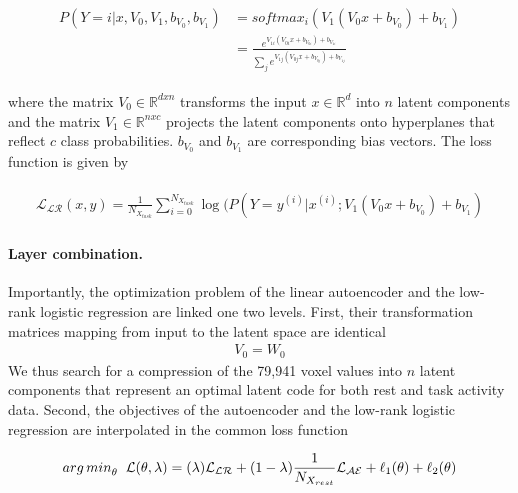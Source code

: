 \documentclass{article} %
\begin{document}
\begin{eqnarray}
  \begin{split}
    P(Y=i|x, V_0,V_1,b_{V_0}, b_{V_1}) &= softmax_i(V_1 (V_0 x + b_{V_0}) + b_{V_1}) \\
    &= \frac {e^{V_{1i} (V_{0i} x + b_{V_{0i}}) + b_{V_{1i}}}} {\sum_j e^{V_{1j} (V_{0j} x + b_{V_{0j}}) + b_{V_{1j}}}}            
  \end{split}
  \label{eq:lr}
\end{eqnarray}

where the matrix $V_0 \in \mathbb{R}^{dxn}$ transforms the input $x \in \mathbb{R}^{d}$
into $n$ latent components
and the matrix $V_1 \in \mathbb{R}^{nxc}$ projects the latent components
onto hyperplanes that reflect $c$ class probabilities.
$b_{V_0}$ and $b_{V_1}$ are corresponding
bias vectors.
The loss function is given by

\begin{eqnarray}
  \begin{split}
    {\mathcal{L_{LR}}}(x, y) = \frac{1}{N_{X_{task}}} \sum_{i=0}^{N_{X_{task}}} \log(P(Y=y^{(i)}|x^{(i)}; V_1 (V_0 x + b_{V_0}) + b_{V_1})
\end{split}
\label{eq:lr_loss}
\end{eqnarray}

\paragraph{Layer combination.}
Importantly, the optimization problem of the linear autoencoder
and the low-rank logistic regression
are linked one two levels. First, their transformation matrices mapping from
input to the latent space are identical
\begin{eqnarray}
  V_0 = W_0
\end{eqnarray}
We thus search for a compression of the 79,941 voxel values into $n$ latent
components that represent an optimal latent code for both
rest and task activity data.
Second, the objectives of the autoencoder and the low-rank
logistic regression are interpolated in the common loss function

\begin{eqnarray}
  \begin{split}
{arg\,min}_\theta \hspace{0.2cm} {\mathcal{L}}(\theta, \lambda) = (\lambda) {\mathcal{L_{LR}}}
+ (1-\lambda)\frac{1}{N_{X_{rest}}} {\mathcal{L_{AE}}} + \ell_1(\theta) + \ell_2(\theta)
  \label{eq:loss_equ}
\end{split}
\end{eqnarray}
\end{document}

